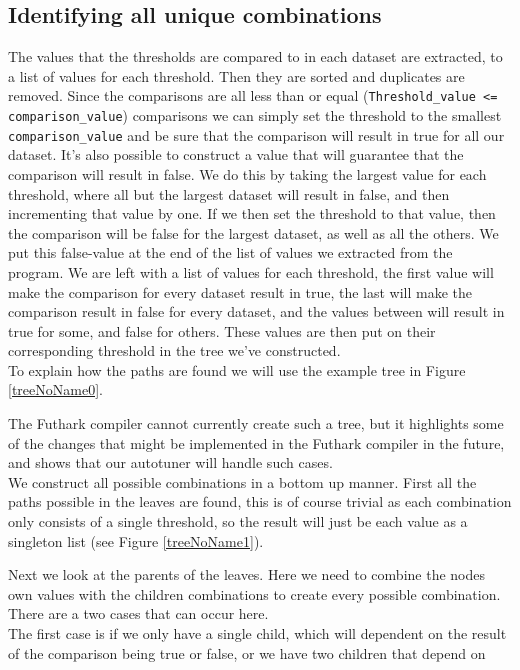\subsection{Identifying all unique combinations}
The values that the thresholds are compared to in each dataset are extracted,
to a list of values for each threshold. Then they are sorted and duplicates are
removed. Since the comparisons are all less than or equal
(\texttt{Threshold\_value <= comparison\_value}) comparisons we can simply
set the threshold to the smallest \texttt{comparison\_value} and be sure that the comparison
will result in true for all our dataset. It's also possible to construct a
value that will guarantee that the comparison will result in false. We do this
by taking the largest value for each threshold, where all but the largest
dataset will result in false, and then incrementing that value by one. If we then set the threshold to that value, then the comparison will be false for the largest dataset, as well as all the others. We put this false-value at
the end of the list of values we extracted from the program. We are left with a
list of values for each threshold, the first value will make the comparison for
every dataset result in true, the last will make the comparison result in false
for every dataset, and the values between will result in true for some, and
false for others. These values are then put on their corresponding threshold in
the tree we've constructed.
\\
To explain how the paths are found we will use the example tree in Figure \ref{treeNoName0}.

The Futhark compiler cannot currently create such a tree, but
it highlights some of the changes that  might be implemented in the Futhark
compiler in the future, and shows that our autotuner will handle such cases. \\
We construct all possible combinations in a bottom up manner. First
all the paths possible in the leaves are found, this is of course trivial as
each combination only consists of a single threshold, so the result will just
be each value as a singleton list (see Figure \ref{treeNoName1}).

Next we look at the parents of the leaves. Here we need to combine the nodes
own values with the children combinations to create every possible
combination. There are a two cases that can occur here. \\
The first case is if we only have a single child, which will dependent on the result of
the comparison being true or false, or we have two children that depend on
